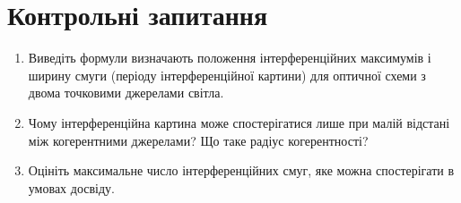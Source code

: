 \section*{Контрольні запитання}
\begin{enumerate}[label*=\arabic*.]
    \item Виведіть формули визначають положення інтерференційних максимумів і ширину
    смуги (періоду інтерференційної картини) для оптичної схеми з двома точковими
    джерелами світла.
    \item Чому інтерференційна картина може спостерігатися лише при малій відстані між когерентними джерелами? Що таке радіус когерентності?
    \item  Оцініть максимальне число інтерференційних смуг, яке можна спостерігати в умовах досвіду.
\end{enumerate}
